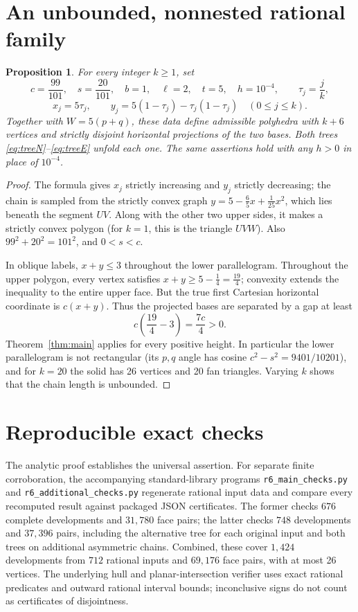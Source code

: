\documentclass[11pt]{amsart}
\newtheorem{proposition}[theorem]{Proposition}
\begin{document}
\section{An unbounded, nonnested rational family}
\begin{proposition}\label{prop:witness}
For every integer \(k\ge1\), set
\begin{equation}\label{eq:witness}
 c=\frac{99}{101},\quad s=\frac{20}{101},\quad b=1,\quad
 \ell=2,\quad t=5,\quad h=10^{-4},\qquad \tau_j=\frac{j}{k},
\end{equation}
\[
 x_j=5\tau_j,\qquad y_j=5(1-\tau_j)-\tau_j(1-\tau_j)
 \quad(0\le j\le k).
\]
Together with \(W=5(p+q)\), these data define admissible polyhedra with \(k+6\) vertices and strictly disjoint horizontal projections of the two bases. Both trees \eqref{eq:treeN}--\eqref{eq:treeE} unfold each one. The same assertions hold with any \(h>0\) in place of \(10^{-4}\).
\end{proposition}
\begin{proof}
The formula gives \(x_j\) strictly increasing and \(y_j\) strictly decreasing; the chain is sampled from the strictly convex graph \(y=5-\frac65 x+\frac1{25}x^2\), which lies beneath the segment \(UV\). Along with the other two upper sides, it makes a strictly convex polygon (for \(k=1\), this is the triangle \(UVW\)). Also \(99^2+20^2=101^2\), and \(0<s<c\).

In oblique labels, \(x+y\le3\) throughout the lower parallelogram. Throughout the upper polygon, every vertex satisfies \(x+y\ge5-\frac14=\frac{19}{4}\); convexity extends the inequality to the entire upper face. But the true first Cartesian horizontal coordinate is \(c(x+y)\). Thus the projected bases are separated by a gap at least
\[
 c\left(\frac{19}{4}-3\right)=\frac{7c}{4}>0.
\]
Theorem~\ref{thm:main} applies for every positive height. In particular the lower parallelogram is not rectangular (its \(p,q\) angle has cosine \(c^2-s^2=9401/10201\)), and for \(k=20\) the solid has 26 vertices and 20 fan triangles. Varying \(k\) shows that the chain length is unbounded.
\end{proof}

\section{Reproducible exact checks}
The analytic proof establishes the universal assertion. For separate finite corroboration, the accompanying standard-library programs \texttt{r6\_main\_checks.py} and \texttt{r6\_additional\_checks.py} regenerate rational input data and compare every recomputed result against packaged JSON certificates. The former checks \(676\) complete developments and \(31{,}780\) face pairs; the latter checks \(748\) developments and \(37{,}396\) pairs, including the alternative tree for each original input and both trees on additional asymmetric chains. Combined, these cover \(1{,}424\) developments from \(712\) rational inputs and \(69{,}176\) face pairs, with at most 26 vertices. The underlying hull and planar-intersection verifier uses exact rational predicates and outward rational interval bounds; inconclusive signs do not count as certificates of disjointness.
\end{document}
